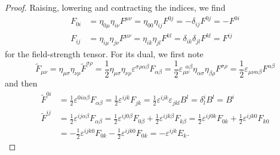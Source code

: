 \mwfieldstrengthextended
\begin{proof}
	Raising, lowering and contracting the indices, we find
	\begin{align*}
		F_{0i}
		&=
		\eta_{0\mu}
		\eta_{i\nu}
		F^{\mu\nu}
		=
		\eta_{00}
		\eta_{ij}
		F^{0j}
		=
		-
		\delta_{ij}
		F^{0j}
		=
		-
		F^{0i}
		\\
		F_{ij}
		&=
		\eta_{i\mu}
		\eta_{j\nu}
		F^{\mu\nu}
		=
		\eta_{ik}
		\eta_{jl}
		F^{kl}
		=
		\delta_{ik}
		\delta_{jl}
		F^{kl}
		=
		F^{ij}
	\end{align*}
	for the field-strength tensor.
	For its dual, we first note
	\begin{equation*}
		\tilde{F}_{\mu\nu}
		=
		\eta_{\mu\sigma}
		\eta_{\nu\rho}
		\tilde{F}^{\sigma\rho}
		=
		\frac{1}{2}
		\eta_{\mu\sigma}
		\eta_{\nu\rho}
		\varepsilon^{\sigma\rho\alpha\beta}
		F_{\alpha\beta}
		=
		\frac{1}{2}
		\varepsilon_{\mu\nu}^{\ \ \alpha\beta}
		\eta_{\alpha\sigma}
		\eta_{\beta\rho}
		F^{\sigma\rho}
		=
		\frac{1}{2}
		\varepsilon_{\mu\nu\alpha\beta}
		F^{\alpha\beta}
	\end{equation*}
	and then
	\begin{align*}
		\tilde{F}^{0i}
		&=
		\frac{1}{2}
		\varepsilon^{0i\alpha\beta}
		F_{\alpha\beta}
		=
		\frac{1}{2}
		\varepsilon^{ijk}
		F_{jk}
		=
		\frac{1}{2}
		\varepsilon^{ijk}
		\varepsilon_{jkl}
		B^l
		=
		\delta^i_l
		B^l
		=
		B^i
		\\
		\tilde{F}^{ij}
		&=
		\frac{1}{2}
		\varepsilon^{ij\alpha\beta}
		F_{\alpha\beta}
		=
		\frac{1}{2}
		\varepsilon^{ij0\beta}
		F_{0\beta}
		+
		\frac{1}{2}
		\varepsilon^{ijk\beta}
		F_{k\beta}
		=
		\frac{1}{2}
		\varepsilon^{ij0k}
		F_{0k}
		+
		\frac{1}{2}
		\varepsilon^{ijk0}
		F_{k0}
		\\
		&=
		-
		\frac{1}{2}
		\varepsilon^{ijk0}
		F_{0k}
		-
		\frac{1}{2}
		\varepsilon^{ijk0}
		F_{0k}
		=
		-
		\varepsilon^{ijk}
		E_k
		.
	\end{align*}
\end{proof}
\mwfieldstrengthcontracted
